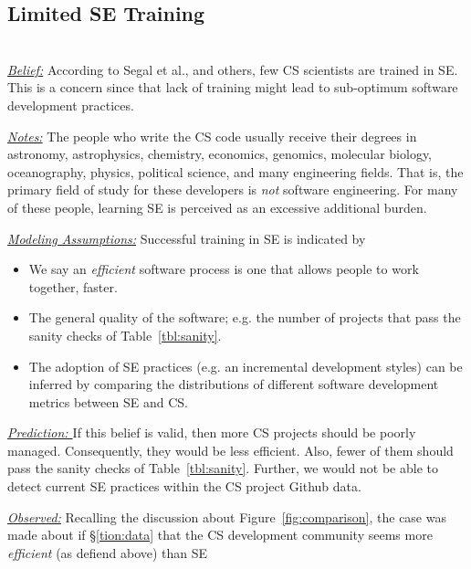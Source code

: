 \documentclass[sigconf,review,anonymous]{acmart}
\newcommand{\bi}{\begin{itemize}}
\newcommand{\ei}{\end{itemize}}
\begin{document}
  








\subsection{Limited SE Training} ~\\
\noindent \textit{\underline{Belief:}} According to Segal et al.,
and others\cite{segal07_enduser, basili08_hpc, carver13_perception, easterbrook_cs, sanders08_risk}, few CS scientists are trained in SE.
This is a concern since that lack of training might lead to sub-optimum software
development practices.

\noindent \textit{\underline{Notes:}} 
The people who write the CS code usually
receive their degrees in
astronomy, astrophysics, chemistry, economics, genomics, molecular biology, oceanography, physics, political science, and many engineering fields.
That is, the primary field of study for these developers is {\em not}
software engineering. For many of these people,
learning SE is perceived as an excessive additional burden\cite{boyle09_lessons}. 

\noindent \textit{\underline{Modeling Assumptions:}} 
Successful training in SE is indicated by
\bi
\item We say an {\em efficient} software process is one that allows  people to work together, faster. 
\item The general quality of the software; e.g. the number of projects that pass the sanity checks of Table~\ref{tbl:sanity}.
\item The adoption of SE practices (e.g. an incremental development styles) can be inferred by comparing the distributions of different software development metrics between SE and CS.
\ei

\noindent \textit{\underline{Prediction: }} If this belief is valid, then more CS
projects should be poorly managed. Consequently, they would be less efficient. Also, fewer of them should
pass the sanity checks of Table~\ref{tbl:sanity}.
Further, we would not be able to detect current SE  practices within the CS project Github data.

\noindent \textit{\underline{Observed:}}
Recalling  the discussion about 
Figure~\ref{fig:comparison},
the case was made about if \S\ref{tion:data} that the CS development community
seems more {\em efficient} (as defiend above) than SE 
\end{document}
